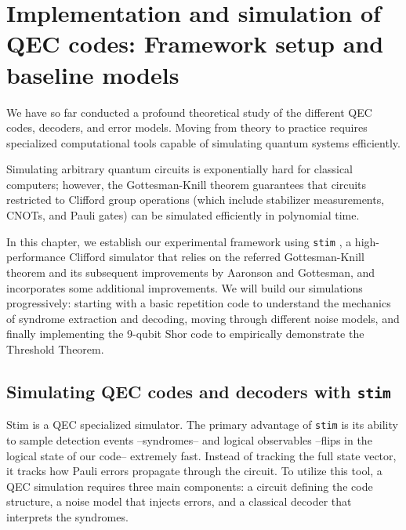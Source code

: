 \chapter{Implementation and simulation of QEC codes: Framework setup and baseline models}
\label{chap:implementation_and_simulation}

We have so far conducted a profound theoretical study of the different QEC codes, decoders, and error models. Moving from theory to practice requires specialized computational tools capable of simulating quantum systems efficiently. 

Simulating arbitrary quantum circuits is exponentially hard for classical computers; however, the Gottesman-Knill theorem \cite{gottesman1998heisenberg} guarantees that circuits restricted to Clifford group operations (which include stabilizer measurements, CNOTs, and Pauli gates) can be simulated efficiently in polynomial time. 

In this chapter, we establish our experimental framework using \texttt{stim} \cite{gidney2021stim}, a high-performance Clifford simulator that relies on the referred Gottesman-Knill theorem and its subsequent improvements by Aaronson and Gottesman\cite{aaronson2004improved}, and incorporates some additional improvements. We will build our simulations progressively: starting with a basic repetition code to understand the mechanics of syndrome extraction and decoding, moving through different noise models, and finally implementing the 9-qubit Shor code to empirically demonstrate the Threshold Theorem.

\section{Simulating QEC codes and decoders with \texttt{stim}}
\label{sec:simulating_with_stim}

Stim is a QEC specialized simulator. The primary advantage of \texttt{stim} is its ability to sample detection events --syndromes-- and logical observables --flips in the logical state of our code-- extremely fast. Instead of tracking the full state vector, it tracks how Pauli errors propagate through the circuit. To utilize this tool, a QEC simulation requires three main components: a circuit defining the code structure, a noise model that injects errors, and a classical decoder that interprets the syndromes.

